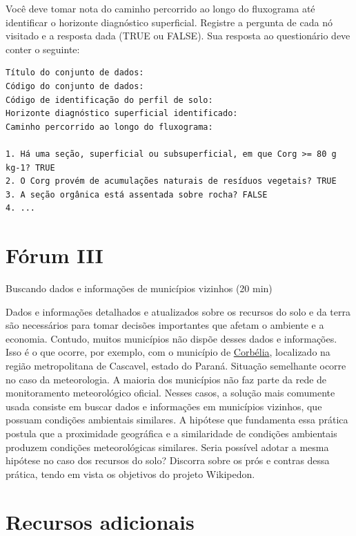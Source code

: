 \documentclass[
  11pt,
  a4paper,
  dvipsnames]{tufte-book}
\begin{document}
Você deve tomar nota do caminho percorrido ao longo do fluxograma até identificar o horizonte diagnóstico superficial. Registre a pergunta de cada nó visitado e a resposta dada (TRUE ou FALSE). Sua resposta ao questionário deve conter o seguinte:

\begin{verbatim}
Título do conjunto de dados:
Código do conjunto de dados:
Código de identificação do perfil de solo:
Horizonte diagnóstico superficial identificado:
Caminho percorrido ao longo do fluxograma:

1. Há uma seção, superficial ou subsuperficial, em que Corg >= 80 g kg-1? TRUE
2. O Corg provém de acumulações naturais de resíduos vegetais? TRUE
3. A seção orgânica está assentada sobre rocha? FALSE
4. ...
\end{verbatim}

\hypertarget{fuxf3rum-iii}{%
\section{Fórum III}\label{fuxf3rum-iii}}

Buscando dados e informações de municípios vizinhos (20 min)

Dados e informações detalhados e atualizados sobre os recursos do solo e da terra são necessários para tomar decisões importantes que afetam o ambiente e a economia. Contudo, muitos municípios não dispõe desses dados e informações. Isso é o que ocorre, por exemplo, com o município de \href{https://pt.wikipedia.org/wiki/Corb\%C3\%A9lia}{Corbélia}, localizado na região metropolitana de Cascavel, estado do Paraná. Situação semelhante ocorre no caso da meteorologia. A maioria dos municípios não faz parte da rede de monitoramento meteorológico oficial. Nesses casos, a solução mais comumente usada consiste em buscar dados e informações em municípios vizinhos, que possuam condições ambientais similares. A hipótese que fundamenta essa prática postula que a proximidade geográfica e a similaridade de condições ambientais produzem condições meteorológicas similares. Seria possível adotar a mesma hipótese no caso dos recursos do solo? Discorra sobre os prós e contras dessa prática, tendo em vista os objetivos do projeto Wikipedon.

\hypertarget{recursos-adicionais-5}{%
\section{Recursos adicionais}\label{recursos-adicionais-5}}
\end{document}
